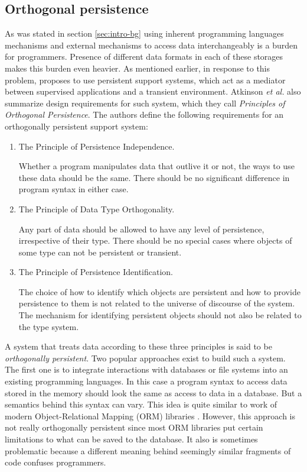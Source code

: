 \subsection{Orthogonal persistence}
\label{sec:LR:orth-persistence}

As was stated in section \ref{sec:intro-bg} using inherent programming
languages mechanisms and external mechanisms to access data interchangeably is
a burden for programmers. Presence of different data formats in each of these
storages makes this burden even heavier. As mentioned earlier, in response to
this problem, \cite{atkinson1995orthogonally} proposes to use persistent
support systems, which act as a mediator between supervised applications and
a transient environment. Atkinson \textit{et al.} also summarize design
requirements for such system, which they call \textit{Principles of Orthogonal
Persistence}. The authors define the following requirements for an orthogonally
persistent support system: 

\begin{enumerate}
    \item The Principle of Persistence Independence. 
    
    Whether a program manipulates data that outlive it or not, the ways to use
    these data should be the same. There should be no significant difference in
    program syntax in either case.

    \item The Principle of Data Type Orthogonality. 
    
    Any part of data should be allowed to have any level of persistence, 
    irrespective of their type. There should be no special cases where objects
    of some type can not be persistent or transient.
    
    \item  The Principle of Persistence Identification. 
    
    The choice of how to identify which objects are persistent and how to
    provide persistence to them is not related to the universe of discourse of
    the system. The mechanism for identifying persistent objects should not also
    be related to the type system.

\end{enumerate}

A system that treats data according to these three principles is said to be
\textit{orthogonally persistent}. Two popular approaches exist to build such a
system. The first one is to integrate interactions with databases or file
systems into an existing programming languages. In this case a program syntax to
access data stored in the memory should look the same as access to data in a
database. But a semantics behind this syntax can vary. This idea is quite similar
to work of modern Object-Relational Mapping (ORM) libraries
\cite{аннин2018краткий,copeland2008essential}. However, this approach is not
really orthogonally persistent since most ORM libraries put certain limitations
to what can be saved to the database. It also is sometimes problematic because a
different meaning behind seemingly similar fragments of code confuses
programmers.

